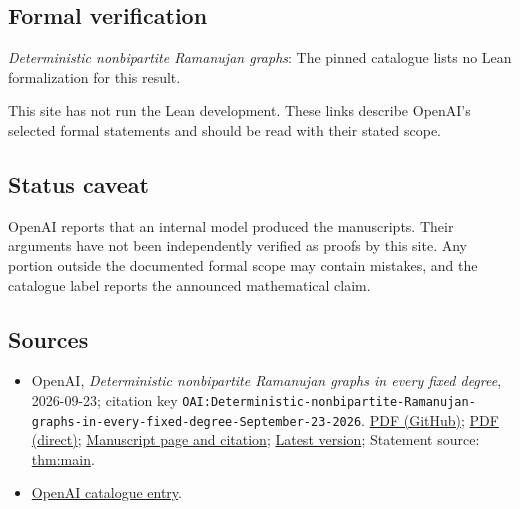 \documentclass[11pt]{article}
\begin{document}
\subsection{Formal verification}
\textit{Deterministic nonbipartite Ramanujan graphs}: The pinned catalogue lists no Lean formalization for this result.

This site has not run the Lean development. These links describe OpenAI’s selected formal statements and should be read with their stated scope.

\subsection{Status caveat}
OpenAI reports that an internal model produced the manuscripts. Their arguments have not been independently verified as proofs by this site. Any portion outside the documented formal scope may contain mistakes, and the catalogue label reports the announced mathematical claim.

\subsection{Sources}
\begin{itemize}
\item OpenAI, \emph{Deterministic nonbipartite Ramanujan graphs in every fixed degree}, 2026-09-23; citation key \texttt{OAI:Deterministic-nonbipartite-Ramanujan-graphs-in-every-fixed-degree-September-23-2026}. \href{https://github.com/openai/math/blob/adc7f1241b42e322a6451854ab7e4b4c146bf78a/preprints/Deterministic-nonbipartite-Ramanujan-graphs-in-every-fixed-degree-September-23-2026/paper.pdf}{PDF (GitHub)}; \href{https://github.com/openai/math/raw/adc7f1241b42e322a6451854ab7e4b4c146bf78a/preprints/Deterministic-nonbipartite-Ramanujan-graphs-in-every-fixed-degree-September-23-2026/paper.pdf}{PDF (direct)}; \href{https://github.com/openai/math/blob/adc7f1241b42e322a6451854ab7e4b4c146bf78a/preprints/Deterministic-nonbipartite-Ramanujan-graphs-in-every-fixed-degree-September-23-2026/README.md}{Manuscript page and citation}; \href{https://github.com/openai/math/blob/main/preprints/Deterministic-nonbipartite-Ramanujan-graphs-in-every-fixed-degree-September-23-2026/paper.pdf}{Latest version}; Statement source: \href{https://github.com/openai/math/blob/adc7f1241b42e322a6451854ab7e4b4c146bf78a/preprints/Deterministic-nonbipartite-Ramanujan-graphs-in-every-fixed-degree-September-23-2026/build/sections/introduction.tex\#L24}{thm:main}.
\item \href{https://github.com/openai/math/blob/adc7f1241b42e322a6451854ab7e4b4c146bf78a/CONTENTS.md}{OpenAI catalogue entry}.
\end{itemize}
\end{document}
